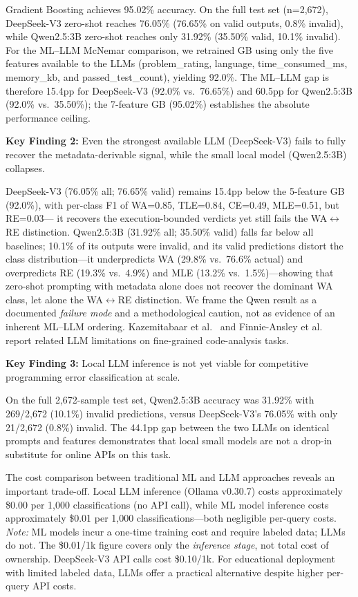 \documentclass[acmsmall]{acmart}
\begin{document}
Gradient Boosting achieves 95.02\% accuracy. On the full test set
(n=2,672), DeepSeek-V3 zero-shot reaches 76.05\% (76.65\% on valid outputs,
0.8\% invalid), while Qwen2.5:3B zero-shot reaches only 31.92\%
(35.50\% valid, 10.1\% invalid). For the ML--LLM McNemar comparison, we
retrained GB using only the five features available to the LLMs
(problem\_rating, language, time\_consumed\_ms, memory\_kb, and
passed\_test\_count), yielding 92.0\%. The ML--LLM gap is therefore
15.4pp for DeepSeek-V3 (92.0\% vs.\ 76.65\%) and 60.5pp for Qwen2.5:3B
(92.0\% vs.\ 35.50\%); the 7-feature GB (95.02\%) establishes the
absolute performance ceiling.

\textbf{Key Finding 2:} Even the strongest available LLM (DeepSeek-V3) fails
to fully recover the metadata-derivable signal, while the small local model
(Qwen2.5:3B) collapses.

DeepSeek-V3 (76.05\% all; 76.65\% valid) remains 15.4pp below the 5-feature GB (92.0\%),
with per-class F1 of WA=0.85, TLE=0.84, CE=0.49, MLE=0.51, but RE=0.03---
it recovers the execution-bounded verdicts yet still fails the WA$\leftrightarrow$RE
distinction. Qwen2.5:3B (31.92\% all; 35.50\% valid) falls far below all
baselines; 10.1\% of its outputs were invalid, and its valid predictions
distort the class distribution---it underpredicts WA (29.8\% vs.\ 76.6\% actual)
and overpredicts RE (19.3\% vs.\ 4.9\%) and MLE (13.2\% vs.\ 1.5\%)---showing
that zero-shot prompting with metadata alone does not recover the dominant
WA class, let alone the WA$\leftrightarrow$RE distinction. We frame the Qwen
result as a documented \emph{failure mode} and a methodological caution, not as
evidence of an inherent ML--LLM ordering. Kazemitabaar et al.~\cite{kazemitabaar2024impact}
and Finnie-Ansley et al.~\cite{finnie2022robots} report related LLM
limitations on fine-grained code-analysis tasks.

\textbf{Key Finding 3:} Local LLM inference is not yet viable for competitive
programming error classification at scale.

On the full 2,672-sample test set, Qwen2.5:3B accuracy was 31.92\% with
269/2,672 (10.1\%) invalid predictions, versus DeepSeek-V3's 76.05\% with
only 21/2,672 (0.8\%) invalid. The 44.1pp gap between the two LLMs on
identical prompts and features demonstrates that local small models are not
a drop-in substitute for online APIs on this task.

The cost comparison between traditional ML and LLM approaches reveals an
important trade-off. Local LLM inference (Ollama v0.30.7) costs approximately \$0.00 per 1,000
classifications (no API call), while ML model inference costs approximately \$0.01
per 1,000 classifications---both negligible per-query costs. \textit{Note:} ML
models incur a one-time training cost and require labeled data; LLMs do not.
The \$0.01/1k figure covers only the \emph{inference stage}, not total cost of ownership.
DeepSeek-V3 API calls cost \$0.10/1k. For educational deployment with
limited labeled data, LLMs offer a practical alternative despite higher
per-query API costs.
\end{document}
